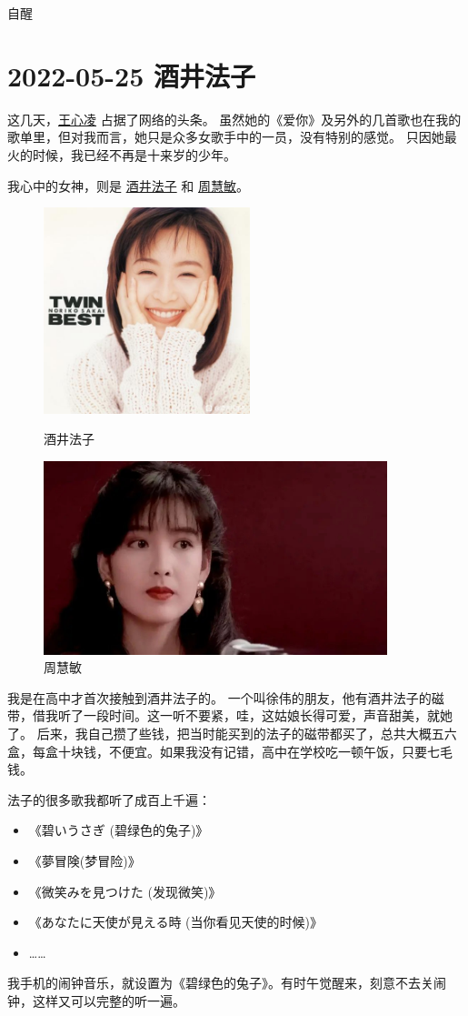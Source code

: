 \begin{taged}{自醒}
\section{2022-05-25 酒井法子}
\end{taged}

这几天，\href{https://www.weibo.com/u/1504965390}{王心凌} 占据了网络的头条。
虽然她的《爱你》及另外的几首歌也在我的歌单里，但对我而言，她只是众多女歌手中的一员，没有特别的感觉。
只因她最火的时候，我已经不再是十来岁的少年。

我心中的女神，则是 \href{https://baike.baidu.com/item/酒井法子/265809}{酒井法子} 和 \href{https://baike.baidu.com/item/周慧敏/6702}{周慧敏}。

\begin{figure}[htbp]
    \centering
    \begin{minipage}{6cm}
        \centering
        \includegraphics[width=6cm]{pic/酒井法子.jpg}
        \caption*{酒井法子}
    \end{minipage}
    \quad
    \begin{minipage}{10cm}
        \centering
        \includegraphics[width=10cm]{pic/周慧敏.jpg}
        \caption*{周慧敏}
    \end{minipage}
\end{figure}

我是在高中才首次接触到酒井法子的。
一个叫徐伟的朋友，他有酒井法子的磁带，借我听了一段时间。这一听不要紧，哇，这姑娘长得可爱，声音甜美，就她了。
后来，我自己攒了些钱，把当时能买到的法子的磁带都买了，总共大概五六盒，每盒十块钱，不便宜。如果我没有记错，高中在学校吃一顿午饭，只要七毛钱。

法子的很多歌我都听了成百上千遍：

\begin{itemize}[nosep, left=\parindent]
    \item 《碧いうさぎ (碧绿色的兔子)》
    \item 《夢冒険(梦冒险)》
    \item 《微笑みを見つけた (发现微笑)》
    \item 《あなたに天使が見える時 (当你看见天使的时候)》
    \item ……
\end{itemize}

我手机的闹钟音乐，就设置为《碧绿色的兔子》。有时午觉醒来，刻意不去关闹钟，这样又可以完整的听一遍。

